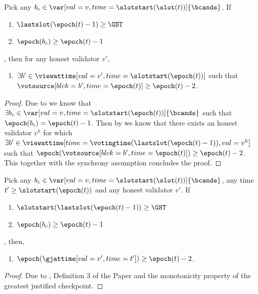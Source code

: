 \documentclass{article}
\begin{document}
\begin{lemma}\label{lem:exists-b-vs-at-least-e-2}
    Pick any $b_c \in \var[val=v,time=\slotstart(\slot(t))]{\bcands}$.
    If
    \begin{enumerate}
        \item $\lastslot(\epoch(t)-1) \geq \GST$
        \item $\epoch(b_c) \geq \epoch(t)-1$
    \end{enumerate},
    then for any honest validator $v'$,
    \begin{enumerate}
        \item $\exists b' \in \viewattime[val=v',time=\slotstart(\epoch(t))]$ such that $\votsource[blck=b',time=\epoch(t)] \geq \epoch(t)-2$.
    \end{enumerate}
\end{lemma}

\begin{proof}
    Due to  we know that $\exists b_c \in \var[val=v,time=\slotstart(\epoch(t))]{\bcands}$ such that $\epoch(b_c) = \epoch(t)-1$.
    Then by  we know that there exists an honest validator $v^h$ for which $\exists b' \in \viewattime[time=\votingtime(\lastslot(\epoch(t)-1)),val=v^h]$ such that $\epoch(\votsource[blck=b',time=\epoch(t)]) \geq \epoch(t)-2$.
    This together with the synchrony assumption concludes the proof.
\end{proof}

\begin{lemma}\label{lem:gj-at-least-e-2-alt}
    Pick any $b_c \in  \var[val=v,time=\slotstart(\slot(t))]{\bcands}$, any time $t' \geq \slotstart(\epoch(t))$ and any honest validator $v'$.
    If
    \begin{enumerate}
        \item $\slotstart(\lastslot(\epoch(t)-1)) \geq \GST$
        \item $\epoch(b_c) \geq \epoch(t)-1$
    \end{enumerate},
    then,
    \begin{enumerate}
        \item $\epoch(\gjattime[val=v',time=t']) \geq \epoch(t)-2$.
    \end{enumerate}
\end{lemma}

\begin{proof}
    Due to , Definition 3 of the Paper and the monotonicity property of the greatest justified checkpoint.
\end{proof}
\end{document}
